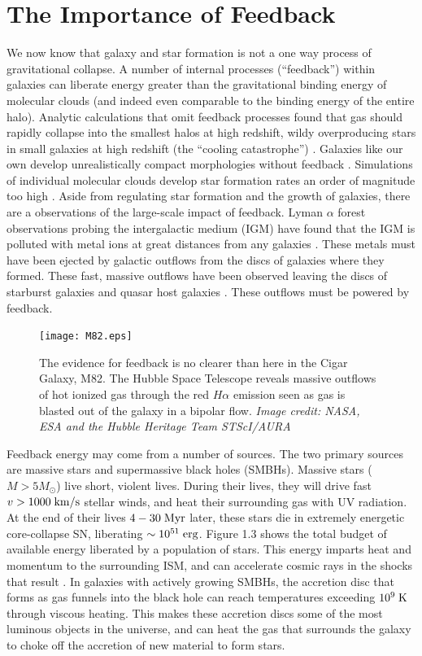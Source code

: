 \section{The Importance of Feedback}
We now know that galaxy and star formation is not a one way process of
gravitational collapse.  A number of internal processes (``feedback'') within
galaxies can liberate energy greater than the gravitational binding energy of
molecular clouds (and indeed even comparable to the binding energy of the entire
halo).  Analytic calculations that omit feedback processes found that gas should
rapidly collapse into the smallest halos at high redshift, wildy overproducing
stars in small galaxies at high redshift (the ``cooling catastrophe'')
\citep{Cole2001,Benson2003}.  Galaxies like our own develop unrealistically
compact morphologies without feedback \citet{Stinson2006}.  Simulations of
individual molecular clouds develop star formation rates an order of magnitude
too high \citep{Agertz2013}.  Aside from regulating star formation and the
growth of galaxies, there are a observations of the large-scale impact of
feedback. Lyman $\alpha$ forest observations probing the intergalactic medium
(IGM) have found that the IGM is polluted with metal ions at great distances
from any galaxies \citep{Sargent1988,Songaila1996,Dave1998}.  These metals must have
been ejected by galactic outflows from the discs of galaxies where they formed.
These fast, massive outflows have been observed leaving the discs of
starburst galaxies and quasar host galaxies \citep{Veilleux2005,Werk2014}.
These outflows must be powered by feedback.

\begin{figure}
    \texttt{[image: M82.eps]}
    \caption[Massive outflows in M82]{The evidence for feedback is no clearer
    than here in the Cigar Galaxy, M82.  The Hubble Space Telescope reveals
    massive outflows of hot ionized gas through the red $H\alpha$ emission seen
    as gas is blasted out of the galaxy in a bipolar flow. \textit{Image credit:
    NASA, ESA and the Hubble Heritage Team STScI/AURA}}
\end{figure}

Feedback energy may come from a number of sources.  The two primary sources are
massive stars and supermassive black holes (SMBHs).  Massive stars
($M>5M_\odot$) live short, violent lives.  During their lives, they will drive
fast $v>1000\;\rm{km/s}$ stellar winds, and heat their surrounding gas with UV
radiation.  At the end of their lives $4-30\;\rm{Myr}$ later, these stars die
in extremely energetic core-collapse SN, liberating
$\sim10^{51}\;\rm{erg}$.  Figure 1.3 shows the total budget of available energy
liberated by a population of stars.  This energy imparts heat and momentum to
the surrounding ISM, and can accelerate cosmic rays in the shocks that result
\citep{Bell1978}.  In galaxies with actively growing SMBHs, the accretion disc
that forms as gas funnels into the black hole can reach temperatures exceeding
$10^9\;\rm{K}$ through viscous heating.  This makes these accretion discs some
of the most luminous objects in the universe, and can heat the gas that
surrounds the galaxy to choke off the accretion of new material to form stars.


